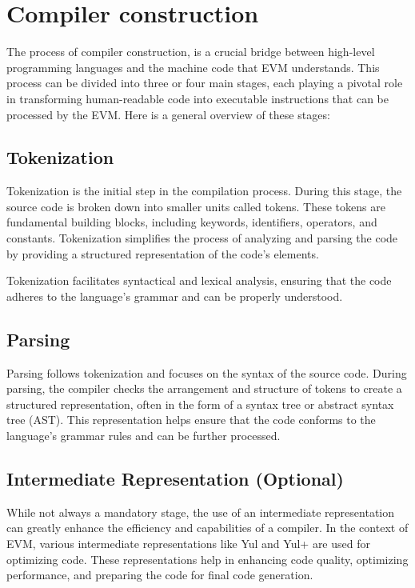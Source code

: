 \section{Compiler construction}

The process of compiler construction, is a crucial bridge between high-level programming languages and the machine code that EVM understands. This process can be divided into three or four main stages, each playing a pivotal role in transforming human-readable code into executable instructions that can be processed by the EVM. Here is a general overview of these stages:

\subsection{Tokenization}
Tokenization is the initial step in the compilation process. During this stage, the source code is broken down into smaller units called tokens. These tokens are fundamental building blocks, including keywords, identifiers, operators, and constants. Tokenization simplifies the process of analyzing and parsing the code by providing a structured representation of the code's elements.

Tokenization facilitates syntactical and lexical analysis, ensuring that the code adheres to the language's grammar and can be properly understood.

\subsection{Parsing}

Parsing follows tokenization and focuses on the syntax of the source code. During parsing, the compiler checks the arrangement and structure of tokens to create a structured representation, often in the form of a syntax tree or abstract syntax tree (AST). This representation helps ensure that the code conforms to the language's grammar rules and can be further processed.

\subsection{Intermediate Representation (Optional)}

While not always a mandatory stage, the use of an intermediate representation can greatly enhance the efficiency and capabilities of a compiler. In the context of EVM, various intermediate representations like Yul and Yul+ are used for optimizing code. These representations help in enhancing code quality, optimizing performance, and preparing the code for final code generation.

